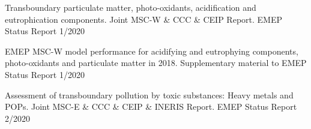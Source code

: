 \enlargethispage{\baselineskip}
\begin{list}{}{\setlength{\leftmargin}{15pt}\setlength{\itemindent}{-\leftmargin}}\small
\item[]
Transboundary particulate matter, photo-oxidants, acidification and eutrophication components. Joint MSC-W \& CCC \& CEIP Report. EMEP Status Report 1/2020

\item[] EMEP MSC-W model performance for acidifying and
  eutrophying components, photo-oxidants and particulate matter in
  2018. Supplementary material to EMEP Status Report 1/2020

\item[]
 Assessment of transboundary pollution by toxic substances: Heavy metals and POPs.  Joint MSC-E  \& CCC  \& CEIP  \& INERIS Report. EMEP Status Report 2/2020

\end{list}









